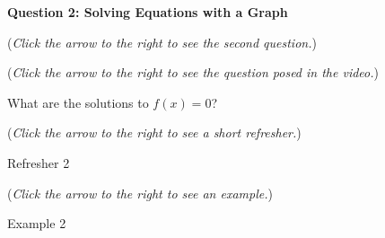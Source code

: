 \documentclass{ximera}
\begin{document}
\textbf{Question 2: Solving Equations with a Graph}
\begin{question}
\begin{flushright}
{\color{blue}(\emph{Click the arrow to the right to see the second question.})}
\end{flushright}
\begin{center}
\begin{expandable}
\begin{flushright}
{\color{blue}(\emph{Click the arrow to the right to see the  question
posed in the video.})}
\end{flushright}
\begin{expandable}
What are the solutions to $f(x)=0$?
\begin{multipleChoice}
\end{multipleChoice}
\begin{flushright}
{\color{blue}(\emph{Click the arrow to the right to see a short refresher.})}
\end{flushright}
\begin{expandable}
\begin{center}
Refresher 2
\end{center}
\end{expandable}
\begin{flushright}
{\color{blue}(\emph{Click the arrow to the right to see an example.})}
\end{flushright}
\begin{expandable}
\begin{center}
Example 2
\end{center}
\end{expandable}
\end{expandable}
\end{expandable}
\end{center}
\end{question}
\end{document}

